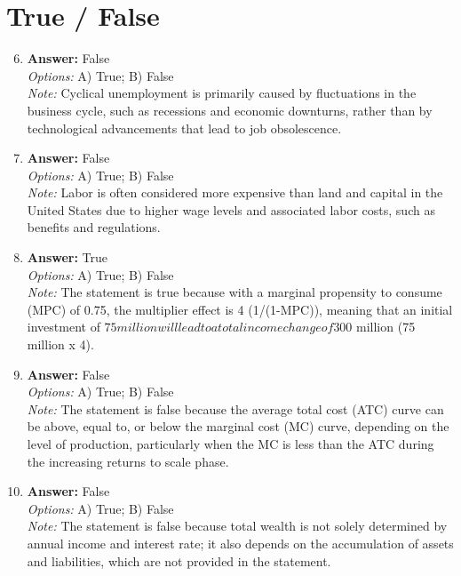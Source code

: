 \documentclass[12pt]{article}
\begin{document}
\section*{True / False}
\begin{enumerate}[label=\arabic*.]
\setcounter{enumi}{5}
\item \textbf{Answer:} False
\\ \textit{Options:} A) True; B) False
\\ \textit{Note:} Cyclical unemployment is primarily caused by fluctuations in the business cycle, such as recessions and economic downturns, rather than by technological advancements that lead to job obsolescence.
\item \textbf{Answer:} False
\\ \textit{Options:} A) True; B) False
\\ \textit{Note:} Labor is often considered more expensive than land and capital in the United States due to higher wage levels and associated labor costs, such as benefits and regulations.
\item \textbf{Answer:} True
\\ \textit{Options:} A) True; B) False
\\ \textit{Note:} The statement is true because with a marginal propensity to consume (MPC) of 0.75, the multiplier effect is 4 (1/(1-MPC)), meaning that an initial investment of $75 million will lead to a total income change of $300 million (75 million x 4).
\item \textbf{Answer:} False
\\ \textit{Options:} A) True; B) False
\\ \textit{Note:} The statement is false because the average total cost (ATC) curve can be above, equal to, or below the marginal cost (MC) curve, depending on the level of production, particularly when the MC is less than the ATC during the increasing returns to scale phase.
\item \textbf{Answer:} False
\\ \textit{Options:} A) True; B) False
\\ \textit{Note:} The statement is false because total wealth is not solely determined by annual income and interest rate; it also depends on the accumulation of assets and liabilities, which are not provided in the statement.
\end{enumerate}
\end{document}
